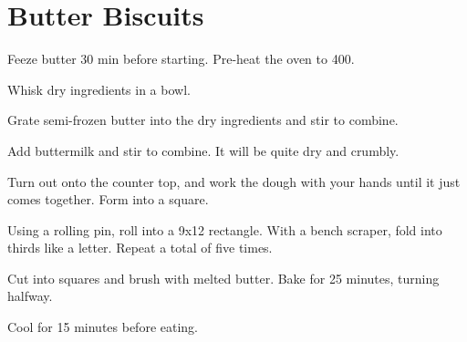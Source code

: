 \section{Butter Biscuits}
\begin{recipe}


Feeze butter 30 min before starting. Pre-heat the oven to 400\degree{}.


Whisk dry ingredients in a bowl.


Grate semi-frozen butter into the dry ingredients and stir to combine. 


Add buttermilk and stir to combine. It will be quite dry and crumbly. 

Turn out onto the counter top, and work the dough with your hands 
until it just comes together. Form into a square. 

Using a rolling pin, roll into a 9x12 rectangle. 
With a bench scraper, fold into thirds like a letter. 
Repeat a total of five times. 

Cut into squares and brush with melted butter. 
Bake for 25 minutes, turning halfway. 

Cool for 15 minutes before eating. 



\ingredients{
}

\end{recipe}
